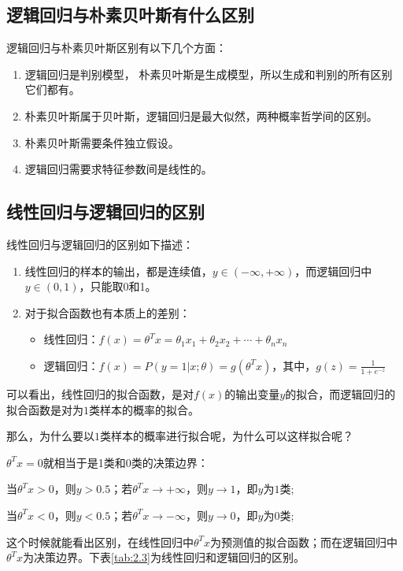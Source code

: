 \subsection{逻辑回归与朴素贝叶斯有什么区别}

逻辑回归与朴素贝叶斯区别有以下几个方面：

\begin{enumerate}
\item 逻辑回归是判别模型， 朴素贝叶斯是生成模型，所以生成和判别的所有区别它们都有。
\item 朴素贝叶斯属于贝叶斯，逻辑回归是最大似然，两种概率哲学间的区别。
\item 朴素贝叶斯需要条件独立假设。
\item 逻辑回归需要求特征参数间是线性的。
\end{enumerate}


\subsection{线性回归与逻辑回归的区别}

线性回归与逻辑回归的区别如下描述：

\begin{enumerate}
\item 线性回归的样本的输出，都是连续值，$ y\in (-\infty ,+\infty )$，而逻辑回归中$y\in (0,1)$，只能取0和1。
\item 对于拟合函数也有本质上的差别： 
	\begin{itemize}
		\item 线性回归：$f(x)=\theta ^{T}x=\theta _{1}x _{1}+\theta _{2}x _{2}+\cdots+\theta _{n}x _{n}$
		\item 逻辑回归：$f(x)=P(y=1|x;\theta )=g(\theta ^{T}x)$，其中，$g(z)=\frac{1}{1+e^{-z}}$
	\end{itemize}
\end{enumerate}

可以看出，线性回归的拟合函数，是对$f(x)$的输出变量$y$的拟合，而逻辑回归的拟合函数是对为$1$类样本的概率的拟合。

那么，为什么要以$1$类样本的概率进行拟合呢，为什么可以这样拟合呢？ 

$\theta ^{T}x=0$就相当于是1类和0类的决策边界： 

当$\theta ^{T}x>0$，则$y>0.5$；若$\theta ^{T}x\rightarrow +\infty $，则$y \rightarrow  1 $，即$y$为$1$类; 

当$\theta ^{T}x<0$，则$y<0.5$；若$\theta ^{T}x\rightarrow -\infty $，则$y \rightarrow  0 $，即$y$为$0$类; 

这个时候就能看出区别，在线性回归中$\theta ^{T}x$为预测值的拟合函数；而在逻辑回归中$\theta ^{T}x$为决策边界。下表\ref{tab:2.3}为线性回归和逻辑回归的区别。

